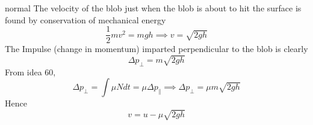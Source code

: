 \begin{solution}{normal}
The velocity of the blob just when the blob is about to hit the surface is found by conservation of mechanical energy$$\frac{1}{2} m v^2 = mgh \implies v= \sqrt{2gh}$$The Impulse (change in momentum) imparted perpendicular to the blob is clearly$$\Delta{p_{\perp}} = m\sqrt{2gh}$$From idea 60,$${\Delta{p_{\perp}}} = \int{\mu Ndt} =  \mu{\Delta{p_{\parallel}}}  \implies \Delta{p_{\perp}} = \mu m\sqrt{2gh}$$Hence$$\boxed{v = u - \mu \sqrt{2gh}}$$
\end{solution}
